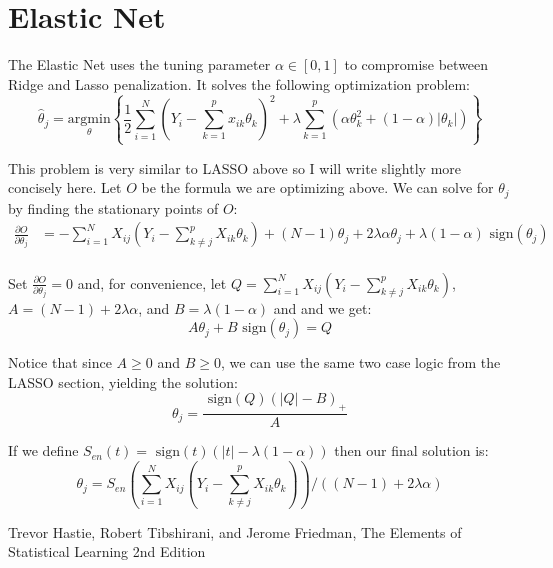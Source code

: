 \documentclass[12pt]{article}
\newcommand{\thh}{\hat{\theta}}
\newcommand{\sgn}{\text{ sign}}
\begin{document}
\section{Elastic Net}
The Elastic Net uses the tuning parameter $\alpha \in [0,1]$ to compromise between Ridge and Lasso penalization.  It solves the following optimization problem:
	$$\thh_j = \underset{\theta}{\text{argmin}}\left\{ \frac{1}{2} \sum\limits_{i=1}^N \left(Y_i - \sum\limits_{k=1}^px_{ik}\theta_k \right)^2 + \lambda \sum\limits_{k=1}^p \left(\alpha\theta_k^2 + (1-\alpha)|\theta_k| \right) \right\}$$

This problem is very similar to LASSO above so I will write slightly more concisely here.  Let $O$ be the formula we are optimizing above.  We can solve for $\theta_j$ by finding the stationary points of $O$:
\begin{equation}\begin{split}
	\frac{\partial O}{\partial \theta_j}
		& = -\sum\limits_{i=1}^N X_{ij}(Y_i - \sum\limits_{k \ne j}^p X_{ik}\theta_k) +(N-1)\theta_j + 2\lambda\alpha\theta_j + \lambda(1-\alpha)\sgn(\theta_j) \\
\end{split}\end{equation}

Set $\frac{\partial O}{\partial \theta_j}=0$ and, for convenience, let $Q = \sum\limits_{i=1}^N X_{ij}(Y_i - \sum\limits_{k \ne j}^p X_{ik}\theta_k)$, $A=(N-1)+2\lambda\alpha$, and $B=\lambda(1-\alpha)$ and and we get:
	$$A\theta_j + B\sgn(\theta_j) = Q$$

Notice that since $A \geq 0$ and $B \geq 0$, we can use the same two case logic from the LASSO section, yielding the solution:
	$$\theta_j = \frac{\sgn(Q)(|Q|-B)_+}{A}$$

If we define $S_{en}(t)= \sgn(t)(|t|-\lambda(1-\alpha))$ then our final solution is:
	$$\theta_j = S_{en}\left(\sum\limits_{i=1}^N X_{ij}(Y_i - \sum\limits_{k \ne j}^p X_{ik}\theta_k)\right)/\left((N-1)+2\lambda\alpha\right)$$

\begin{thebibliography}{9}
Trevor Hastie, Robert Tibshirani, and Jerome Friedman,
The Elements of Statistical Learning 2nd Edition
\end{thebibliography}
\end{document}
